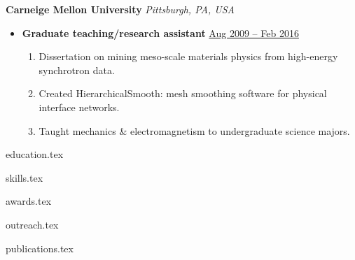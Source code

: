 \documentclass[10.5pt]{article}
\begin{document}
{\color{red}\textbf{Carneige Mellon University} \hfill \textit{Pittsburgh, PA, USA}}\par
\begin{itemize}
    \item
        \textbf{Graduate teaching/research assistant}
        \hfill \underline{Aug 2009 -- Feb 2016} \par
        \begin{enumerate}
            \item Dissertation on mining meso-scale materials physics from high-energy synchrotron data.
            \item Created HierarchicalSmooth: mesh smoothing software for physical interface networks. 
            \item Taught mechanics \& electromagnetism to undergraduate science majors.
        \end{enumerate}
\end{itemize} 


{education.tex}

{skills.tex}

{awards.tex}

{outreach.tex}

{publications.tex}
\end{document}

